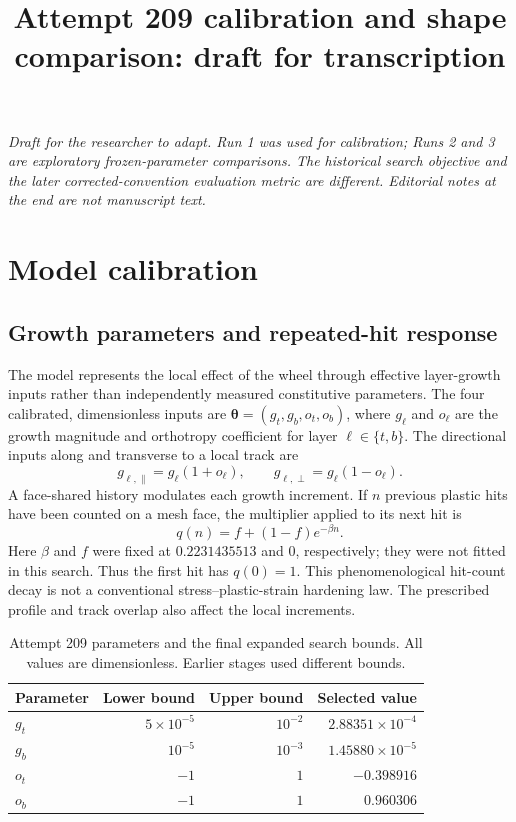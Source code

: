 \documentclass[11pt]{article}
\begin{document}
\title{Attempt 209 calibration and shape comparison: draft for transcription}
\author{}\date{}\maketitle
\noindent\textit{Draft for the researcher to adapt. Run 1 was used for calibration; Runs 2 and 3 are exploratory frozen-parameter comparisons. The historical search objective and the later corrected-convention evaluation metric are different. Editorial notes at the end are not manuscript text.}

\section{Model calibration}
\subsection{Growth parameters and repeated-hit response}
The model represents the local effect of the wheel through effective layer-growth inputs rather than independently measured constitutive parameters. The four calibrated, dimensionless inputs are $\boldsymbol\theta=(g_t,g_b,o_t,o_b)$, where $g_\ell$ and $o_\ell$ are the growth magnitude and orthotropy coefficient for layer $\ell\in\{t,b\}$. The directional inputs along and transverse to a local track are
\begin{equation}
 g_{\ell,\parallel}=g_\ell(1+o_\ell),\qquad
 g_{\ell,\perp}=g_\ell(1-o_\ell).
 \label{eq:directional-growth}
\end{equation}
A face-shared history modulates each growth increment. If $n$ previous plastic hits have been counted on a mesh face, the multiplier applied to its next hit is
\begin{equation}
 q(n)=f+(1-f)e^{-\beta n}.
 \label{eq:hit-decay}
\end{equation}
Here $\beta$ and $f$ were fixed at $0.2231435513$ and $0$, respectively; they were not fitted in this search. Thus the first hit has $q(0)=1$. This phenomenological hit-count decay is not a conventional stress--plastic-strain hardening law. The prescribed profile and track overlap also affect the local increments.

\begin{table}[ht]
\centering
\caption{Attempt 209 parameters and the final expanded search bounds. All values are dimensionless. Earlier stages used different bounds.}
\label{tab:attempt209-parameters}
\begin{tabular}{lrrr}\toprule
Parameter & Lower bound & Upper bound & Selected value \\\midrule
$g_t$ & $5\times10^{-5}$ & $10^{-2}$ & $2.88351\times10^{-4}$ \\
$g_b$ & $10^{-5}$ & $10^{-3}$ & $1.45880\times10^{-5}$ \\
$o_t$ & $-1$ & $1$ & $-0.398916$ \\
$o_b$ & $-1$ & $1$ & $0.960306$ \\\bottomrule
\end{tabular}
\end{table}
\end{document}
